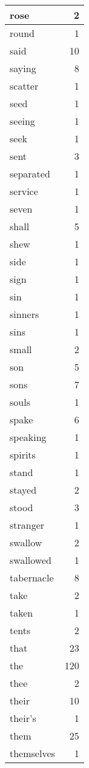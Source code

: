 \begin{center}
\begin{longtable}{l|r}
rose & 2 \\ \hline
round & 1 \\ \hline
said & 10 \\ \hline
saying & 8 \\ \hline
scatter & 1 \\ \hline
seed & 1 \\ \hline
seeing & 1 \\ \hline
seek & 1 \\ \hline
sent & 3 \\ \hline
separated & 1 \\ \hline
service & 1 \\ \hline
seven & 1 \\ \hline
shall & 5 \\ \hline
shew & 1 \\ \hline
side & 1 \\ \hline
sign & 1 \\ \hline
sin & 1 \\ \hline
sinners & 1 \\ \hline
sins & 1 \\ \hline
small & 2 \\ \hline
son & 5 \\ \hline
sons & 7 \\ \hline
souls & 1 \\ \hline
spake & 6 \\ \hline
speaking & 1 \\ \hline
spirits & 1 \\ \hline
stand & 1 \\ \hline
stayed & 2 \\ \hline
stood & 3 \\ \hline
stranger & 1 \\ \hline
swallow & 2 \\ \hline
swallowed & 1 \\ \hline
tabernacle & 8 \\ \hline
take & 2 \\ \hline
taken & 1 \\ \hline
tents & 2 \\ \hline
that & 23 \\ \hline
the & 120 \\ \hline
thee & 2 \\ \hline
their & 10 \\ \hline
their's & 1 \\ \hline
them & 25 \\ \hline
themselves & 1 \\ \hline

\end{longtable}
\end{center}
